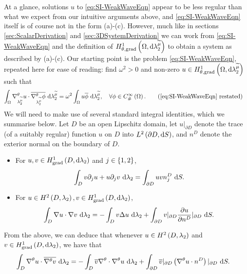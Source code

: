 At a glance, solutions $u$ to \eqref{eq:SI-WeakWaveEqn} appear to be less regular than what we expect from our intuitive arguments above, and \eqref{eq:SI-WeakWaveEqn} itself is of course not in the form (a)-(c).
However, much like in sections \ref{sec:ScalarDerivation} and \ref{sec:3DSystemDerivation} we can work from \eqref{eq:SI-WeakWaveEqn} and the definition of $H^1_{\theta, \mathrm{grad}}\left( \Omega, \mathrm{d}\lambda_2^{\widetilde{\mu}} \right)$ to obtain a system as described by (a)-(c).
Our starting point is the problem \eqref{eq:SI-WeakWaveEqn}, repeated here for ease of reading: find $\omega^2>0$ and non-zero $u\in H^1_{\theta, \mathrm{grad}}\left( \Omega, \mathrm{d}\lambda_2^{\widetilde{\mu}} \right)$ such that
\begin{align*}
	\integral{\ddom}{ \tgrad_{\ccompMes}u\cdot\overline{\tgrad_{\ccompMes}\phi} }{\ccompMes}
	&= \omega^2 \integral{\ddom}{ u\overline{\phi} }{\ccompMes}, \quad\forall\phi\in\psmooth{\ddom}. \tag{\eqref{eq:SI-WeakWaveEqn} restated}
\end{align*}
We will need to make use of several standard integral identities, which we summarise below.
Let $D$ be an open Lipschitz domain, let $u\vert_{\partial D}$ denote the trace (of a suitably regular) function $u$ on $D$ into $L^{2}\left( \partial D,\mathrm{d} S \right)$, and $n^D$ denote the exterior normal on the boundary of $D$.
\begin{itemize}
	\item For $u,v\in H^1_\mathrm{grad}\left( D, \mathrm{d}\lambda_2 \right)$ and $j\in\left\{ 1,2 \right\}$,
	\begin{align*}
		\int_{D} v\partial_j u + u\partial_j v  \ \mathrm{d}\lambda_2
		&= \int_{\partial D} u v n^D_j  \ \mathrm{d}S.
	\end{align*}
	\item For $u\in H^2\left( D,\lambda_2 \right), v\in H^1_\mathrm{grad}\left( D, \mathrm{d}\lambda_2 \right)$,
	\begin{align*}
		\int_{D} \nabla u\cdot \nabla v  \ \mathrm{d}\lambda_2 
		&=  - \int_{D} v\Delta u  \ \mathrm{d}\lambda_2 + \int_{\partial D} v\vert_{\partial D}\dfrac{\partial u}{\partial n^D}\vert_{\partial D}  \ \mathrm{d}S.
	\end{align*}
\end{itemize}
From the above, we can deduce that whenever $u\in H^2\left( D,\lambda_2 \right)$ and $v\in H^1_\mathrm{grad}\left( D, \mathrm{d}\lambda_2 \right)$, we have that
\begin{align*}
	\int_{D} \nabla^{\theta} u\cdot\overline{\nabla^{\theta} v}  \ \mathrm{d}\lambda_2
	&= - \int_{D} \overline{v}\nabla^{\theta}\cdot\nabla^{\theta} u  \ \mathrm{d}\lambda_2 + \int_{\partial D} \overline{v}\vert_{\partial D}\left( \nabla^{\theta} u\cdot n^D \right)\vert_{\partial D}  \ \mathrm{d}S.
\end{align*}

